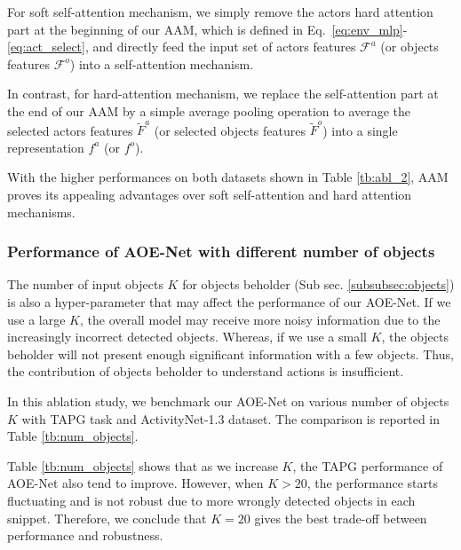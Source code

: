 \documentclass[sn-mathphys]{sn-jnl}
\theoremstyle{thmstyleone}\newtheorem{theorem}{Theorem}\newtheorem{proposition}[theorem]{Proposition}
\theoremstyle{thmstyletwo}\newtheorem{example}{Example}\newtheorem{remark}{Remark}
\theoremstyle{thmstylethree}\newtheorem{definition}{Definition}
\begin{document}
For soft self-attention mechanism, we simply remove the actors hard attention part at the beginning of our AAM, which is defined in Eq.~\ref{eq:env_mlp}-\ref{eq:act_select}, and directly feed the input set of actors features $\mathcal{F}^a$ (or objects features $\mathcal{F}^o$) into a self-attention mechanism.

In contrast, for hard-attention mechanism, we replace the self-attention part at the end of our AAM by a simple average pooling operation to average the selected actors features $\tilde{F}^a$ (or selected objects features $\tilde{F}^o$) into a single representation $f^a$ (or $f^o$).

With the higher performances on both datasets shown in Table \ref{tb:abl_2}, AAM proves its appealing advantages over soft self-attention and hard attention mechanisms.

\subsubsection{Performance of AOE-Net with different number of objects}
\label{sec:topK}
The number of input objects $K$ for objects beholder (Sub sec. \ref{subsubsec:objects}) is also a hyper-parameter that may affect the performance of our AOE-Net. If we use a large $K$, the overall model may receive more noisy information due to the increasingly incorrect detected objects. Whereas, if we use a small $K$, the objects beholder will not present enough significant information with a few objects. Thus, the contribution of objects beholder to understand actions is insufficient.

In this ablation study, we benchmark our AOE-Net on various number of objects $K$ with TAPG task and ActivityNet-1.3 \cite{caba2015activitynet} dataset. The comparison is reported in Table \ref{tb:num_objects}.

Table \ref{tb:num_objects} shows that as we increase $K$, the TAPG performance of AOE-Net also tend to improve. However, when $K > 20$, the performance starts fluctuating and is not robust due to more wrongly detected objects in each snippet. Therefore, we conclude that $K=20$ gives the best trade-off between performance and robustness.
\end{document}
